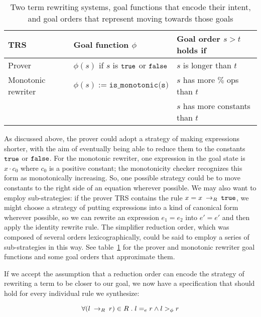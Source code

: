 \begin{table}[]
    \centering
    \begin{tabular}{|l|l|l|}
    \hline 
        TRS & Goal function $\phi$ & Goal order $s > t$ holds if \\
        \hline 
        Prover &  $\phi(s)$ if $s$ is $\texttt{true}$ or $\texttt{false}$ & $s$ is longer than $t$\\
        \hline
        Monotonic rewriter & $\phi(s) := \texttt{is_monotonic(s)}$ & $s$ has more $\%$ ops than $t$\\
                 & & $s$ has more constants than $t$\\
        \hline
    \end{tabular}
    \caption{Two term rewriting systems, goal functions that encode their intent, and goal orders that represent moving towards those goals}
    \label{tab:trsspecs}
\end{table}

As discussed above, the prover could adopt a strategy of making expressions shorter, with the aim of eventually being able to reduce them to the constants $\texttt{true}$ or $\texttt{false}$. For the monotonic rewriter, one expression in the goal state is $x \cdot c_0$ where $c_0$ is a positive constant; the monotonicity checker recognizes this form as monotonically increasing. So, one possible strategy could be to move constants to the right side of an equation wherever possible. We may also want to employ sub-strategies: if the prover TRS contains the rule $x = x \:\rightarrow_{R}\: \texttt{true}$, we might choose a strategy of putting expressions into a kind of canonical form wherever possible, so we can rewrite an expression $e_1 = e_2$ into $e' = e'$ and then apply the identity rewrite rule. The simplifier reduction order, which was composed of several orders lexicographically, could be said to employ a series of sub-strategies in this way. See table~\ref{tab:trsspecs} for the prover and monotonic rewriter goal functions and some goal orders that approximate them.

If we accept the assumption that a reduction order can encode the strategy of rewriting a term to be closer to our goal, we now have a specification that should hold for every individual rule we synthesize:

\[ \forall (l \:\rightarrow_{R}\: r) \in R \;.\; l =_e r \wedge l >_{\phi} r
\]


